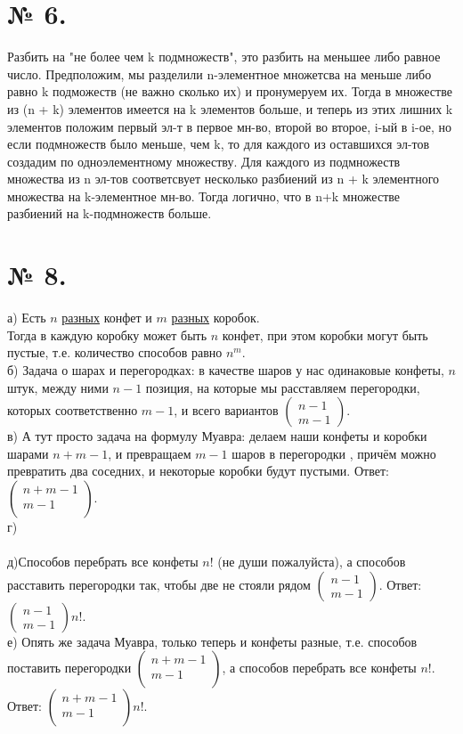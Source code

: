 \documentclass[a4paper,11pt]{report}
\begin{document}
\section{№ 6.}
Разбить на "не более чем k подмножеств", это разбить на меньшее либо равное число.
Предположим, мы разделили n-элементное множетсва на меньше либо равно k подможеств (не важно сколько их) и пронумеруем их. 
Тогда в множестве из (n + k) элементов имеется на k элементов больше, и теперь из этих лишних k элементов положим первый эл-т 
в первое мн-во, второй во второе, i-ый в i-ое, но если подмножеств было меньше, чем k, то для каждого из оставшихся эл-тов создадим по
одноэлементному множеству. Для каждого из подмножеств множества из n эл-тов соответсвует несколько разбиений из 
n + k элементного множества на k-элементное мн-во. Тогда логично, что в n+k множестве разбиений на k-подмножеств больше.
\section{№ 8.}
а) Есть $n$ \underline{разных} конфет и $m$ \underline{разных} коробок.\\
Тогда в каждую коробку может быть $n$ конфет, при этом 
коробки могут быть пустые, т.е. количество способов равно $n^m$.\\
б) Задача о шарах и перегородках: в качестве шаров у нас одинаковые конфеты, $n$ штук, 
между ними $n - 1$ позиция, на которые мы расставляем перегородки, которых соответственно 
$m - 1$, и всего вариантов $
\begin{pmatrix}
n  - 1\\
m - 1
\end{pmatrix}
$.\\
в) А тут просто задача на формулу Муавра: делаем наши конфеты и коробки шарами $n + m - 1$,
и превращаем $m - 1$ шаров в перегородки , причём можно превратить два соседних,
и некоторые коробки будут пустыми. Ответ: $
\begin{pmatrix}
n + m - 1\\
m - 1\\
\end{pmatrix}
$.\\
г)\\\\
д)Способов перебрать все конфеты $n!$ (не души пожалуйста), а способов расставить
перегородки так, чтобы две не стояли рядом $
\begin{pmatrix}
n  - 1\\
m - 1
\end{pmatrix}
$. Ответ: $
\begin{pmatrix}
n  - 1\\
m - 1
\end{pmatrix}
n!
$.\\
е) Опять же задача Муавра, только теперь и конфеты разные, т.е. способов поставить перегородки
$
\begin{pmatrix}
n + m - 1\\
m - 1\\
\end{pmatrix}
$, а способов перебрать все конфеты $n!$. Ответ: $
\begin{pmatrix}
n + m - 1\\
m - 1\\
\end{pmatrix}
n!
$.
\end{document}
